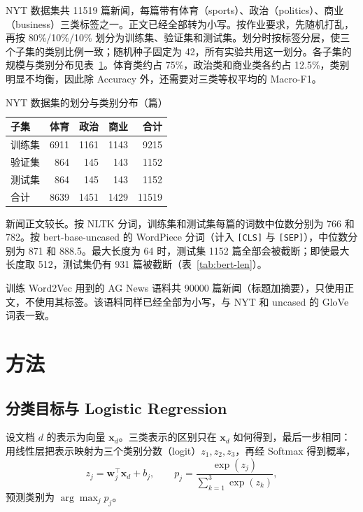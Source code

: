 \documentclass[lang=cn,a4paper]{elegantpaper}
\begin{document}
NYT 数据集共 11519 篇新闻，每篇带有体育（sports）、政治（politics）、商业（business）三类标签之一。正文已经全部转为小写。按作业要求，先随机打乱，再按 80\%/10\%/10\% 划分为训练集、验证集和测试集。划分时按标签分层，使三个子集的类别比例一致；随机种子固定为 42，所有实验共用这一划分。各子集的规模与类别分布见表~\ref{tab:data}。体育类约占 75\%，政治类和商业类各约占 12.5\%，类别明显不均衡，因此除 Accuracy 外，还需要对三类等权平均的 Macro-F1。

\begin{table}[htbp]
  \centering
  \caption{NYT 数据集的划分与类别分布（篇）}
  \label{tab:data}
  \begin{tabular}{lrrrr}
    \toprule
    子集 & 体育 & 政治 & 商业 & 合计 \\
    \midrule
    训练集 & 6911 & 1161 & 1143 & 9215 \\
    验证集 & 864 & 145 & 143 & 1152 \\
    测试集 & 864 & 145 & 143 & 1152 \\
    \midrule
    合计 & 8639 & 1451 & 1429 & 11519 \\
    \bottomrule
  \end{tabular}
\end{table}

新闻正文较长。按 NLTK 分词，训练集和测试集每篇的词数中位数分别为 766 和 782。按 bert-base-uncased 的 WordPiece 分词（计入 \texttt{[CLS]} 与 \texttt{[SEP]}），中位数分别为 871 和 888.5。最大长度为 64 时，测试集 1152 篇全部会被截断；即使最大长度取 512，测试集仍有 931 篇被截断（表~\ref{tab:bert-len}）。

训练 Word2Vec 用到的 AG News 语料共 90000 篇新闻（标题加摘要）\cite{zhang2015character}，只使用正文，不使用其标签。该语料同样已经全部为小写，与 NYT 和 uncased 的 GloVe 词表一致。

\section{方法}

\subsection{分类目标与 Logistic Regression}
\label{sec:objective}

设文档 $d$ 的表示为向量 $\mathbf{x}_d$。三类表示的区别只在 $\mathbf{x}_d$ 如何得到，最后一步相同：用线性层把表示映射为三个类别分数（logit）$z_1,z_2,z_3$，再经 Softmax 得到概率，
\begin{equation}
\label{eq:softmax}
z_j=\mathbf{w}_j^{\top}\mathbf{x}_d+b_j,\qquad
p_j=\frac{\exp(z_j)}{\sum_{k=1}^{3}\exp(z_k)},
\end{equation}
预测类别为 $\arg\max_j p_j$。
\end{document}
